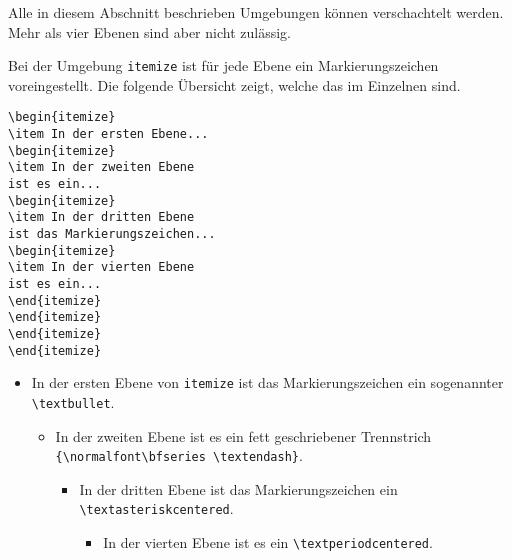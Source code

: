 Alle in diesem Abschnitt beschrieben Umgebungen können verschachtelt werden. Mehr als vier Ebenen sind aber nicht zulässig. 

Bei der Umgebung \verb!itemize! ist für jede Ebene ein Markierungszeichen voreingestellt. Die folgende Übersicht zeigt, welche das im Einzelnen sind.

\begin{minipage}[h]{0.44\textwidth}
\setlength{\parskip}{1em}
\frenchspacing
\begin{Verbatim}[frame=single]
\begin{itemize}
\item In der ersten Ebene...
\begin{itemize}
\item In der zweiten Ebene
ist es ein...
\begin{itemize}
\item In der dritten Ebene
ist das Markierungszeichen...
\begin{itemize}
\item In der vierten Ebene 
ist es ein...
\end{itemize}
\end{itemize}
\end{itemize}
\end{itemize}
\end{Verbatim}
\end{minipage}
\hfill
\begin{minipage}[h]{0.54\textwidth}
\setlength{\parskip}{1em}
\frenchspacing
\begin{itemize}
\item In der ersten Ebene von \texttt{itemize} ist das Markierungszeichen ein sogenannter
\texttt{\textbackslash textbullet}.
\begin{itemize}
\item In der zweiten Ebene ist es ein fett geschriebener Trennstrich
\texttt{\{\textbackslash normalfont\textbackslash bfseries \textbackslash textendash\}}.
\begin{itemize}
\item In der dritten Ebene ist das Markierungszeichen ein \texttt{\textbackslash textasteriskcentered}.
\begin{itemize}
\item In der vierten Ebene ist es ein \texttt{\textbackslash textperiodcentered}. 
\end{itemize}
\end{itemize}
\end{itemize}
\end{itemize}
\end{minipage}

